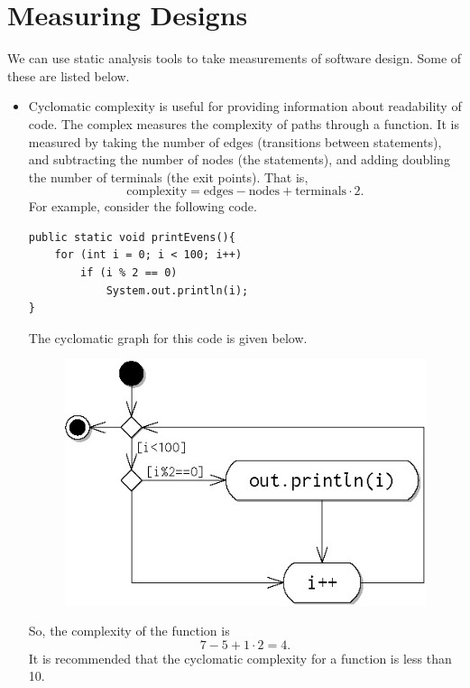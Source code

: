 \documentclass[a4paper, openany]{memoir}
\begin{document}
\section{Measuring Designs}
We can use static analysis tools to take measurements of software design. Some of these are listed below.
\begin{itemize}
    \item Cyclomatic complexity is useful for providing information about readability of code. The complex measures the complexity of paths through a function. It is measured by taking the number of edges (transitions between statements), and subtracting the number of nodes (the statements), and adding doubling the number of terminals (the exit points). That is,
    \[\text{complexity} = \text{edges} - \text{nodes} + \text{terminals} \cdot 2.\]
    For example, consider the following code.
    \begin{verbatim}
public static void printEvens(){
    for (int i = 0; i < 100; i++)
        if (i % 2 == 0)
            System.out.println(i);
}
    \end{verbatim}
    The cyclomatic graph for this code is given below.
    \begin{figure}[H]
        \centering
        \includegraphics{src/10.2 cyclomatic flowchart.png}
    \end{figure}
    \noindent So, the complexity of the function is
    \[7 - 5 + 1 \cdot 2 = 4.\]
    It is recommended that the cyclomatic complexity for a function is less than 10.
    

\end{itemize}
\end{document}
